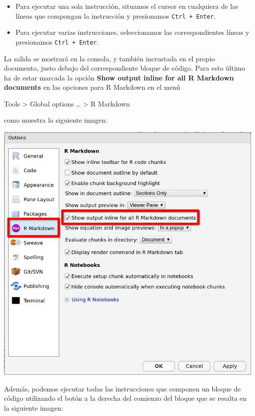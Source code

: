 \documentclass[
  title=normal,
  notoc,
  bib=normal]{mnye}
\begin{document}
\begin{itemize}
\item
  Para ejecutar una sola instrucción, situamos el cursor en cualquiera de las líneas que compongan la instrucción y presionamos \texttt{Ctrl\ +\ Enter}.
\item
  Para ejecutar varias instrucciones, seleccionamos las correspondientes líneas y presionamos \texttt{Ctrl\ +\ Enter}.
\end{itemize}

La salida se mostrará en la consola, y también incrustada en el propio documento, justo debajo del correspondiente bloque de código. Para esto último ha de estar marcada la opción \textbf{Show output inline for all R Markdown documents} en las opciones para R Markdown en el menú

\begin{menu}
Tools \textgreater{} Global options \ldots{} \textgreater{} R Markdown

\end{menu}

como muestra la siguiente imagen:

\begin{center}\includegraphics[width=1\linewidth]{images/options-r-markdown-b} \end{center}

Además, podemos ejecutar todas las instrucciones que componen un bloque de código utilizando el botón a la derecha del comienzo del bloque que se resalta en la siguiente imagen:
\end{document}
